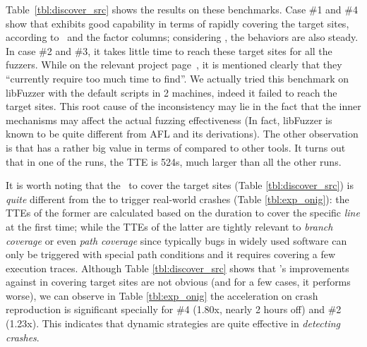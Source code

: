 Table~\ref{tbl:discover_src} shows the results on these benchmarks. 
Case \#1 and \#4 show that \dFOT exhibits good capability in terms of rapidly covering the target sites, according to {\utte}~and the factor columns; considering \alz, the behaviors are also steady. 
In case \#2 and \#3, it takes little time to reach these target sites for all the fuzzers.
While on the relevant project page~\cite{libpng-fts}, it is mentioned clearly that they ``currently require too much time to find''. 
We actually tried this benchmark on libFuzzer with the default scripts in 2 machines, indeed it failed to reach the target sites. 
This root cause of the inconsistency may lie in the fact that the inner mechanisms may affect the actual fuzzing effectiveness (In fact, libFuzzer is known to be quite different from AFL and its derivations). The other observation is that {{\dGO}} has a rather big value in terms of {\utte} compared to other tools. It turns out that in one of the runs, the TTE is 524s, much larger than all the other runs.

It is worth noting that the \utte~to cover the target sites (Table \ref{tbl:discover_src}) is \emph{quite} different from the {\utte} to trigger real-world crashes (Table \ref{tbl:exp_onig}): the TTEs of the former are calculated based on the duration to cover the specific \emph{line} at the first time; while the TTEs of the latter are tightly relevant to \emph{branch coverage} or even \emph{path coverage} since typically bugs in widely used software can only be triggered with special path conditions and it requires covering a few execution traces. Although Table \ref{tbl:discover_src} shows that \dFOT's improvements against \dGO in covering target sites are not obvious (and for a few cases, it performs worse), we can observe in Table \ref{tbl:exp_onig} the acceleration on crash reproduction is significant specially for \#4 (1.80x, nearly 2 hours off) and \#2 (1.23x). This indicates that dynamic strategies are quite effective in \emph{detecting crashes}.

